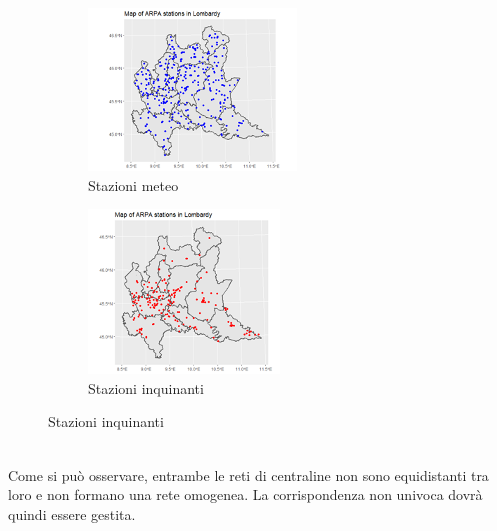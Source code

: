\documentclass{article}
\begin{document}
\begin{figure}[h!]         
    \centering
    \begin{subfigure}{.5\textwidth}
      \centering
      \includegraphics[width=.7\linewidth]{Picture/Lpollution.png}
      \caption{Stazioni meteo}
      \label{fig:sub1}
    \end{subfigure}%
    \begin{subfigure}{.5\textwidth}
      \centering
      \includegraphics[width=.7\linewidth]{Picture/Lweather.png}
      \caption{Stazioni inquinanti}
      \label{fig:sub2}
    \end{subfigure}
    \label{fig:test}
\end{figure}
\\Come si può osservare, entrambe le reti di centraline non sono equidistanti tra loro e non formano 
una rete omogenea. La corrispondenza non univoca dovrà quindi essere gestita.
\end{document}
